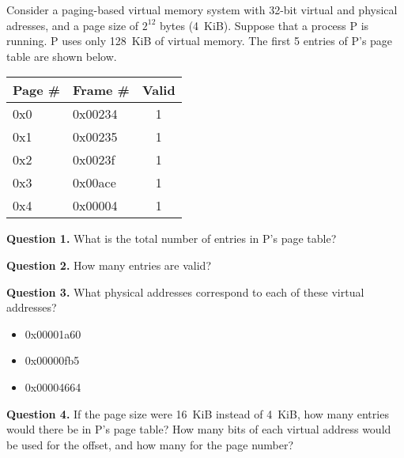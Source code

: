 \documentclass[letterpaper,twocolumn,10pt]{article}
\begin{document}
\pagestyle{fancy}
\fancyfoot[C]{\thepage}

Consider a paging-based virtual memory system with 32-bit virtual and physical 
adresses, and a page size of $2^{12}$ bytes (4~KiB).  Suppose that a process P 
is running. P uses only 128~KiB of virtual memory.  The first 5 entries of P's 
page table are shown below.

\begin{table}
\centering
\begin{tabular}{l|l|c}
\toprule
Page \# & Frame \# & Valid \\
\midrule
0x0 & 0x00234 & 1\\
    0x1 & 0x00235 & 1\\
    0x2 & 0x0023f & 1\\
    0x3 & 0x00ace & 1\\
    0x4 & 0x00004 & 1\\
\bottomrule
\end{tabular}
\end{table}

\vspace{4em}

\noindent
\textbf{Question 1.} What is the total number of entries in P's page table?

\vspace{16em}

\noindent
\textbf{Question 2.} How many entries are valid?

\vspace{16em}
\break

\textbf{Question 3.} What physical addresses correspond to each of these 
virtual addresses?

\begin{itemize}
\item 0x00001a60
\item 0x00000fb5
\item 0x00004664
\end{itemize}

\vspace{16em}

\textbf{Question 4.} If the page size were 16~KiB instead of 4~KiB, how many 
entries would there be in P's page table?  How many bits of each virtual 
address would be used for the offset, and how many for the page number?
\end{document}
